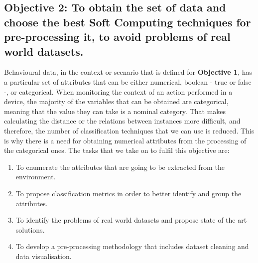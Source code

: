 
\newcommand{\objectivedata}{To obtain the set of data and choose the best Soft Computing techniques for pre-processing it, to avoid problems of real world datasets.}
\subsection*{Objective 2: \objectivedata} 
\label{subsec:intro:obj:methodology}

Behavioural data, in the context or scenario that is defined for \textbf{Objective 1}, has a particular set of attributes that can be either numerical, boolean - true or false -, or categorical. When monitoring the context of an action performed in a device, the majority of the variables that can be obtained are categorical, meaning that the value they can take is a nominal category. That makes calculating the distance or the relations between instances more difficult, and therefore, the number of classification techniques that we can use is reduced. This is why there is a need for obtaining numerical attributes from the processing of the categorical ones. The tasks that we take on to fulfil this objective are:

\begin{enumerate}
	\item To enumerate the attributes that are going to be extracted from the environment.
	\item To propose classification metrics in order to better identify and group the attributes.
	\item To identify the problems of real world datasets and propose state of the art solutions.
	\item To develop a pre-processing methodology that includes dataset cleaning and data visualisation.
\end{enumerate}


